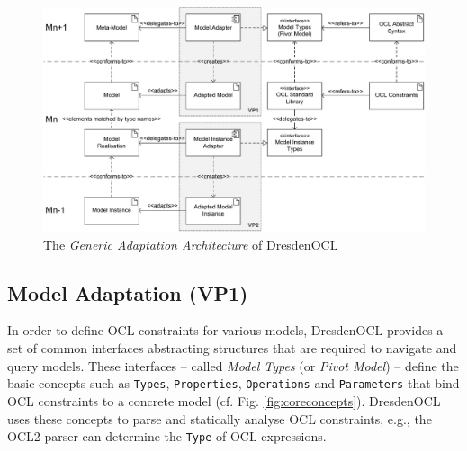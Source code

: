 \begin{figure}[p]
				\includegraphics[width=1.00\textwidth]{figures/modeladaptation.pdf}
			\caption{The \emph{Generic Adaptation Architecture} of DresdenOCL
			}
			\label{fig:modeladaptation}			
		\end{figure}

\subsection{Model Adaptation (VP1)}

	In order to define OCL constraints for various models,
	DresdenOCL provides a set of common interfaces abstracting structures
	that are required to navigate and query models.
	These interfaces -- called \emph{Model Types} (or \emph{Pivot Model}) \cite{braeuerOCL07} -- define
	the basic	concepts such as \texttt{Types}, \texttt{Properties}, \texttt{Operations} and \texttt{Parameters}
	that bind OCL constraints to a concrete model (cf. Fig. \ref{fig:coreconcepts}).
	DresdenOCL uses these concepts to parse and statically analyse OCL constraints, 
	e.g., the OCL2 parser	can determine the \texttt{Type} of OCL expressions.
	
